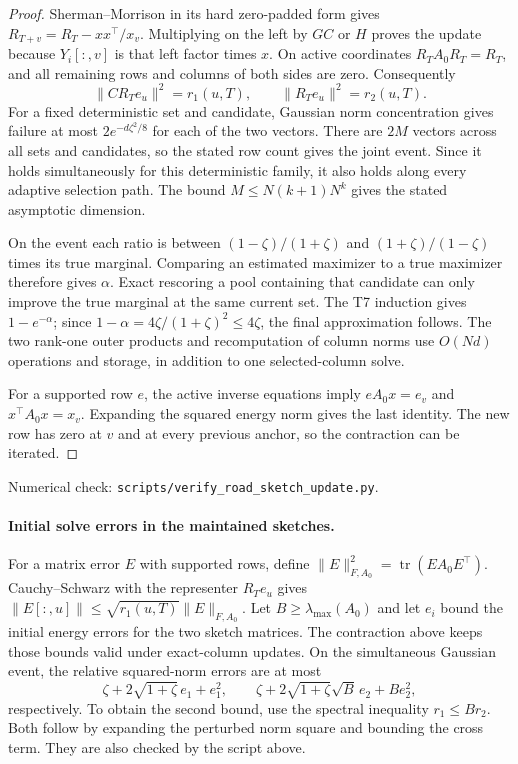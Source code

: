 \documentclass[11pt]{article}
\DeclareMathOperator{\tr}{tr}
\begin{document}
\begin{proof}
Sherman--Morrison in its hard zero-padded form gives
$R_{T+v}=R_T-xx^\top/x_v$. Multiplying on the left by $GC$ or
$H$ proves the update because $Y_i[:,v]$ is that left factor
times $x$. On active coordinates $R_TA_0R_T=R_T$, and all
remaining rows and columns of both sides are zero. Consequently
\[
 \|CR_Te_u\|^2=r_1(u,T),\qquad
 \|R_Te_u\|^2=r_2(u,T).
\]
For a fixed deterministic set and candidate, Gaussian norm
concentration gives failure at most $2e^{-d\zeta^2/8}$ for each
of the two vectors. There are $2M$ vectors across all sets and
candidates, so the stated row count gives the joint event.
Since it holds simultaneously for this deterministic family,
it also holds along every adaptive selection path. The bound
$M\leq N(k+1)N^k$ gives the stated asymptotic dimension.

On the event each ratio is between $(1-\zeta)/(1+\zeta)$ and
$(1+\zeta)/(1-\zeta)$ times its true marginal. Comparing an
estimated maximizer to a true maximizer therefore gives $\alpha$.
Exact rescoring a pool containing that candidate can only improve
the true marginal at the same current set. The T7 induction gives
$1-e^{-\alpha}$; since $1-\alpha=4\zeta/(1+\zeta)^2\leq4\zeta$,
the final approximation follows. The two rank-one outer products
and recomputation of column norms use $O(Nd)$ operations and
storage, in addition to one selected-column solve.

For a supported row $e$, the active inverse equations imply
$eA_0x=e_v$ and $x^\top A_0x=x_v$. Expanding the squared energy
norm gives the last identity. The new row has zero at $v$ and
at every previous anchor, so the contraction can be iterated.
\end{proof}
\noindent Numerical check:
\texttt{scripts/verify\_road\_sketch\_update.py}.

\paragraph{Initial solve errors in the maintained sketches.}
For a matrix error $E$ with supported rows, define
$\|E\|_{F,A_0}^2=\tr(EA_0E^\top)$.
Cauchy--Schwarz with the representer $R_Te_u$ gives
$\|E[:,u]\|\leq\sqrt{r_1(u,T)}\|E\|_{F,A_0}$.
Let $B\geq\lambda_{\max}(A_0)$ and let $e_i$ bound the initial
energy errors for the two sketch matrices. The contraction above
keeps those bounds valid under exact-column updates. On the
simultaneous Gaussian event, the relative squared-norm errors
are at most
\[
 \zeta+2\sqrt{1+\zeta}\,e_1+e_1^2,
 \qquad
 \zeta+2\sqrt{1+\zeta}\sqrt B\,e_2+B e_2^2,
\]
respectively. To obtain the second bound, use the spectral
inequality $r_1\leq B r_2$. Both follow by expanding the
perturbed norm square and bounding the cross term. They are
also checked by the script above.
\end{document}

